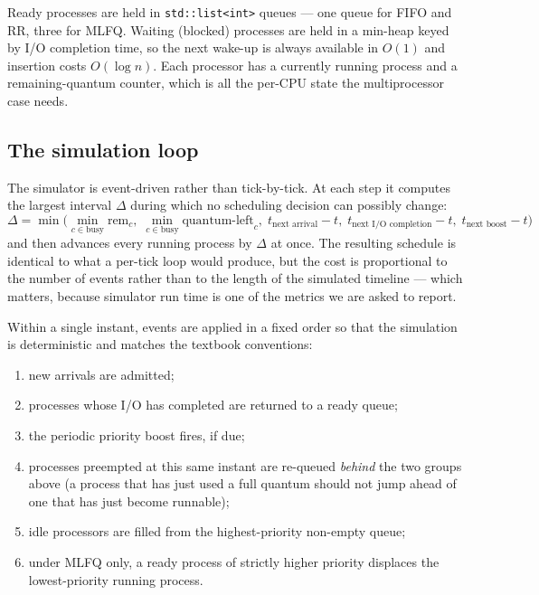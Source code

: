 \documentclass[11pt,a4paper]{article}
\begin{document}
Ready processes are held in \texttt{std::list<int>} queues --- one queue for
FIFO and RR, three for MLFQ. Waiting (blocked) processes are held in a
min-heap keyed by I/O completion time, so the next wake-up is always available
in $O(1)$ and insertion costs $O(\log n)$. Each processor has a currently
running process and a remaining-quantum counter, which is all the per-CPU state
the multiprocessor case needs.

\subsection{The simulation loop}

The simulator is event-driven rather than tick-by-tick. At each step it
computes the largest interval $\Delta$ during which no scheduling decision can
possibly change:
\[
\Delta = \min\Big(
  \min_{c \in \text{busy}} \text{rem}_c,\;
  \min_{c \in \text{busy}} \text{quantum-left}_c,\;
  t_{\text{next arrival}} - t,\;
  t_{\text{next I/O completion}} - t,\;
  t_{\text{next boost}} - t
\Big)
\]
and then advances every running process by $\Delta$ at once. The resulting
schedule is identical to what a per-tick loop would produce, but the cost is
proportional to the number of events rather than to the length of the
simulated timeline --- which matters, because simulator run time is one of the
metrics we are asked to report.

Within a single instant, events are applied in a fixed order so that the
simulation is deterministic and matches the textbook conventions:

\begin{enumerate}\itemsep2pt
  \item new arrivals are admitted;
  \item processes whose I/O has completed are returned to a ready queue;
  \item the periodic priority boost fires, if due;
  \item processes preempted at this same instant are re-queued \emph{behind}
        the two groups above (a process that has just used a full quantum
        should not jump ahead of one that has just become runnable);
  \item idle processors are filled from the highest-priority non-empty queue;
  \item under MLFQ only, a ready process of strictly higher priority displaces
        the lowest-priority running process.
\end{enumerate}
\end{document}

